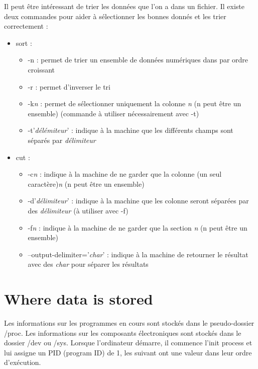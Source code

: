 \documentclass{article}
\begin{document}
\noindent Il peut être intéressant de trier les données que l'on a dans un fichier. Il existe deux commandes pour aider à sélectionner les bonnes donnés et les trier correctement :
\begin{itemize}
    \item sort :
        \begin{itemize}
            \item -n : permet de trier un ensemble de données numériques dans par ordre croissant
            \item -r : permet d'inverser le tri
            \item -k\textit{n} : permet de sélectionner uniquement la colonne \textit{n} (n peut être un ensemble) (commande à utiliser nécessairement avec -t)
            \item -t'\textit{délémiteur}' : indique à la machine que les différents champs sont séparés par \textit{délimiteur}
        \end{itemize}
    \item cut :
        \begin{itemize}
            \item -c\textit{n} : indique à la machine de ne garder que la colonne (un seul caractère)\textit{n} (n peut être un ensemble)
            \item -d'\textit{délimiteur}' : indique à la machine que les colonne seront séparées par des \textit{délimiteur} (à utiliser avec -f)
            \item -f\textit{n} : indique à la machine de ne garder que la section \textit{n} (n peut être un ensemble)
            \item --output-delimiter='\textit{char}' : indique à la machine de retourner le résultat avec des \textit{char} pour séparer les résultats
        \end{itemize}
\end{itemize}




\newpage
\section{Where data is stored}
Les informations sur les programmes en cours sont stockés dans le pseudo-dossier /proc. Les informations sur les composants électroniques sont stockés dans le dossier /dev ou /sys. Lorsque l'ordinateur démarre, il commence l'init process et lui assigne un PID (program ID) de 1, les suivant ont une valeur dans leur ordre d'exécution.\newline
\end{document}
